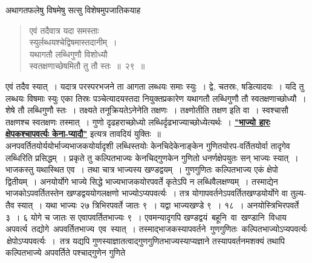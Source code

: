\documentclass[11pt, openany]{book}
\begin{document}
\newpage%

 अथागतफलेषु विषमेषु सत्सु विशेषमुपजातिकयाह\textendash 

 \label{29}
\begin{quote}
    \bs
     एवं तदैवात्र यदा समस्ताः \\

\vspace{-7mm}
\hspace{1cm} स्युर्लब्धयश्चेद्विषमास्तदानीम्~। \\

 \vspace{-7mm}
 यथागतौ लब्धिगुणौ विशोध्यौ \\

\vspace{-7mm}
\hspace{1cm} स्वतक्षणाच्छेषमितौ तु तौ स्तः~॥~२९~॥ 
\end{quote}

 एवं तदैव स्यात्~। यदात्र परस्परभजने ता आगता लब्धयः 
समाः स्युः~। द्वे, चतस्रः, षडित्यादयः~। यदि तु लब्धयः विषमाः स्युः 
एका तिस्रः पञ्चेत्यादयस्तदा नियुक्तप्रकारेण यथागतौ लब्धिगुणौ तौ 
स्वतक्षणाच्छोध्यौ~। शेषे तौ लब्धिगुणौ स्तः~। तक्ष्यते तनूक्रियतेऽनेनेति
तक्षणः~। तक्ष्णोतीति तक्षण इति वा~। स्वश्चासौ तक्षणश्च स्वतक्षणः 
तस्मात्~। गुणो दृढहराच्छोध्यो लब्धिर्दृढभाज्याच्छोध्येत्यर्थः~।
\hyperref[25]{\textbf{"भाज्यो हारः क्षेपकश्चापवर्त्यः केना-प्यादौ"}} इत्यत्र तावदियं युक्तिः~॥ \\

\vspace{-3mm}
 अनपवर्तितयोर्ययोर्भाज्यभाजकयोर्यादृशी लब्धिस्तयोः केनचिदेकेनाङ्केन
गुणितयोरप-वर्तितयोर्वा तादृगेव लब्धिरिति प्रसिद्धम्~। प्रकृते तु
कल्पितभाज्यः केनचिद्गुणकेन गुणितो धनर्णक्षेपयुतः सन् भाज्यः स्यात्~। भाजकस्तु 
यथास्थित एव~। तथा चात्र भाज्यस्य खण्डद्वयम्~। गुणगुणितः कल्पितभाज्य 
एकं क्षेपो द्वितीयम्~। अनयोर्योगे भाज्ये सिद्धे भाज्यभाजकयोरपवर्ते \;कृतेऽपि \;न \;लब्धिवैलक्षण्यम्~। \;तस्माद्येन \;भाजकोऽपवर्तितस्तेन खण्डद्वययोगलक्षणो 
भाज्योऽप्यपवर्त्यः~। तत्र योगापवर्तनेऽपवर्तितखण्डयोर्योगे वा तुल्य-तैव
स्यात्~। यथा भाज्यः २७ त्रिभिरपवर्ते जातः ९~। यद्वा भाज्यखण्डे ९~। १८~।
अनयोस्त्रिभिरपवर्ते ३~। ६ योगे च जातः स एवापवर्तितभाज्यः ९~। 
एवमन्यादृगपि खण्डद्वयं \,बहूनि \,वा \,खण्डानि \,विधाय \,अपवर्त्य \,तद्योगे \,अपवर्तितभाज्य \,एव \,स्यात्~। तस्माद्भाजकस्यापवर्तने \,गुणगुणितः \,कल्पितभाज्योऽप्यपवर्त्यः \,क्षेपोऽप्यपवर्त्यः~। \,तत्र यद्यपि
गुणस्याज्ञातत्वाद्गुणगुणितभाज्यस्याप्यज्ञाने तस्यापवर्तनमशक्यं तथापि कल्पितभाज्ये अपवर्तिते पश्चाद्गुणेन गुणिते
\end{document}
